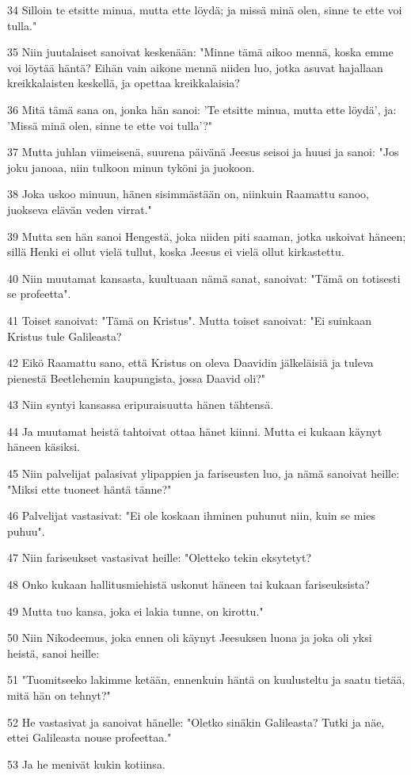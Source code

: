 \par 34 Silloin te etsitte minua, mutta ette löydä; ja missä minä olen, sinne te ette voi tulla."
\par 35 Niin juutalaiset sanoivat keskenään: "Minne tämä aikoo mennä, koska emme voi löytää häntä? Eihän vain aikone mennä niiden luo, jotka asuvat hajallaan kreikkalaisten keskellä, ja opettaa kreikkalaisia?
\par 36 Mitä tämä sana on, jonka hän sanoi: 'Te etsitte minua, mutta ette löydä', ja: 'Missä minä olen, sinne te ette voi tulla'?"
\par 37 Mutta juhlan viimeisenä, suurena päivänä Jeesus seisoi ja huusi ja sanoi: "Jos joku janoaa, niin tulkoon minun tyköni ja juokoon.
\par 38 Joka uskoo minuun, hänen sisimmästään on, niinkuin Raamattu sanoo, juokseva elävän veden virrat."
\par 39 Mutta sen hän sanoi Hengestä, joka niiden piti saaman, jotka uskoivat häneen; sillä Henki ei ollut vielä tullut, koska Jeesus ei vielä ollut kirkastettu.
\par 40 Niin muutamat kansasta, kuultuaan nämä sanat, sanoivat: "Tämä on totisesti se profeetta".
\par 41 Toiset sanoivat: "Tämä on Kristus". Mutta toiset sanoivat: "Ei suinkaan Kristus tule Galileasta?
\par 42 Eikö Raamattu sano, että Kristus on oleva Daavidin jälkeläisiä ja tuleva pienestä Beetlehemin kaupungista, jossa Daavid oli?"
\par 43 Niin syntyi kansassa eripuraisuutta hänen tähtensä.
\par 44 Ja muutamat heistä tahtoivat ottaa hänet kiinni. Mutta ei kukaan käynyt häneen käsiksi.
\par 45 Niin palvelijat palasivat ylipappien ja fariseusten luo, ja nämä sanoivat heille: "Miksi ette tuoneet häntä tänne?"
\par 46 Palvelijat vastasivat: "Ei ole koskaan ihminen puhunut niin, kuin se mies puhuu".
\par 47 Niin fariseukset vastasivat heille: "Oletteko tekin eksytetyt?
\par 48 Onko kukaan hallitusmiehistä uskonut häneen tai kukaan fariseuksista?
\par 49 Mutta tuo kansa, joka ei lakia tunne, on kirottu."
\par 50 Niin Nikodeemus, joka ennen oli käynyt Jeesuksen luona ja joka oli yksi heistä, sanoi heille:
\par 51 "Tuomitseeko lakimme ketään, ennenkuin häntä on kuulusteltu ja saatu tietää, mitä hän on tehnyt?"
\par 52 He vastasivat ja sanoivat hänelle: "Oletko sinäkin Galileasta? Tutki ja näe, ettei Galileasta nouse profeettaa."
\par 53 Ja he menivät kukin kotiinsa.

